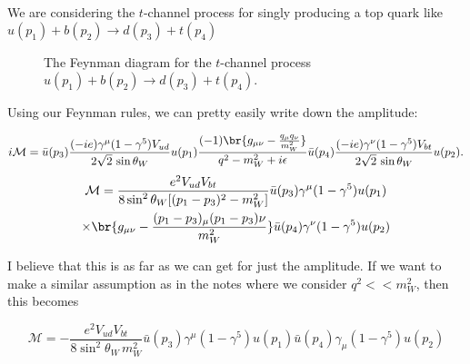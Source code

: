 \section{}

We are considering the $t$-channel process for singly producing a top quark like $u(p_1) + b(p_2) \rightarrow d(p_3) + t(p_4)$
\begin{figure}[ht]
  \centering

  
  \caption{The Feynman diagram for the $t$-channel process $u(p_1) + b(p_2) \rightarrow d(p_3) + t(p_4)$.}
  \label{fig:1}
\end{figure}


Using our Feynman rules, we can pretty easily write down the amplitude:

\begin{equation}
  i\mathcal{M} = \bar{u}(p_3) \frac{(-ie)\gamma^\mu(1-\gamma^5)V_{ud}}{2\sqrt{2} \, \sin\theta_W} u(p_1) \frac{(-1) \br{g_{\mu\nu} - \frac{q_\mu q_\nu}{m_W^2}}}{q^2 - m_W^2 + i\epsilon} \bar{u}(p_4) \frac{(-ie) \gamma^\nu(1-\gamma^5)V_{bt}}{2\sqrt{2} \, \sin\theta_W} u(p_2).
\end{equation}
\begin{multline}
  \mathcal{M} = \frac{e^2 V_{ud}V_{bt}}{8\sin^2\theta_W [(p_1 - p_3)^2 - m_W^2]} \bar{u}(p_3)\gamma^\mu(1-\gamma^5)u(p_1) \\ \times \br{g_{\mu\nu} - \frac{(p_1 - p_3)_\mu(p_1 - p_3)\nu}{m_W^2}} \bar{u}(p_4)\gamma^\nu(1-\gamma^5)u(p_2)
\end{multline}

I believe that this is as far as we can get for just the amplitude. If we want to make a similar assumption as in the notes where we consider $q^2 << m_W^2$, then this becomes

\begin{equation}
  \mathcal{M} = -\frac{e^2 V_{ud}V_{bt}}{8\sin^2\theta_W \, m_W^2} \bar{u}(p_3)\gamma^\mu(1-\gamma^5)u(p_1) \bar{u}(p_4)\gamma_\mu(1-\gamma^5)u(p_2)
\end{equation}






